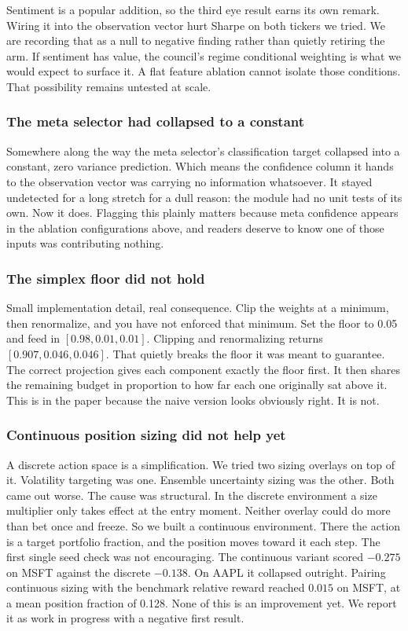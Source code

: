 \documentclass[conference]{IEEEtran}
\begin{document}
Sentiment is a popular addition, so the third eye result earns its own remark. Wiring it into the observation vector hurt Sharpe on both tickers we tried. We are recording that as a null to negative finding rather than quietly retiring the arm. If sentiment has value, the council's regime conditional weighting is what we would expect to surface it. A flat feature ablation cannot isolate those conditions. That possibility remains untested at scale.

\subsubsection{The meta selector had collapsed to a constant}

Somewhere along the way the meta selector's classification target collapsed into a constant, zero variance prediction. Which means the confidence column it hands to the observation vector was carrying no information whatsoever. It stayed undetected for a long stretch for a dull reason: the module had no unit tests of its own. Now it does. Flagging this plainly matters because meta confidence appears in the ablation configurations above, and readers deserve to know one of those inputs was contributing nothing.

\subsubsection{The simplex floor did not hold}

Small implementation detail, real consequence. Clip the weights at a minimum, then renormalize, and you have not enforced that minimum. Set the floor to 0.05 and feed in $[0.98, 0.01, 0.01]$. Clipping and renormalizing returns $[0.907, 0.046, 0.046]$. That quietly breaks the floor it was meant to guarantee. The correct projection gives each component exactly the floor first. It then shares the remaining budget in proportion to how far each one originally sat above it. This is in the paper because the naive version looks obviously right. It is not.

\subsubsection{Continuous position sizing did not help yet}

A discrete action space is a simplification. We tried two sizing overlays on top of it. Volatility targeting was one. Ensemble uncertainty sizing was the other. Both came out worse. The cause was structural. In the discrete environment a size multiplier only takes effect at the entry moment. Neither overlay could do more than bet once and freeze. So we built a continuous environment. There the action is a target portfolio fraction, and the position moves toward it each step. The first single seed check was not encouraging. The continuous variant scored $-0.275$ on MSFT against the discrete $-0.138$. On AAPL it collapsed outright. Pairing continuous sizing with the benchmark relative reward reached $0.015$ on MSFT, at a mean position fraction of 0.128. None of this is an improvement yet. We report it as work in progress with a negative first result.
\end{document}
